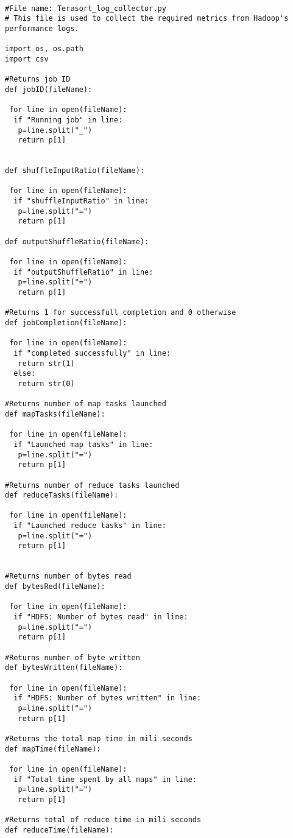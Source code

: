 \begin{verbatim}

#File name: Terasort_log_collector.py 
# This file is used to collect the required metrics from Hadoop's performance logs. 

import os, os.path
import csv

#Returns job ID
def jobID(fileName):

 for line in open(fileName):
  if "Running job" in line:
   p=line.split("_")
   return p[1]


def shuffleInputRatio(fileName):

 for line in open(fileName):
  if "shuffleInputRatio" in line:
   p=line.split("=")
   return p[1]

def outputShuffleRatio(fileName):

 for line in open(fileName):
  if "outputShuffleRatio" in line:
   p=line.split("=")
   return p[1]

#Returns 1 for successfull completion and 0 otherwise
def jobCompletion(fileName):

 for line in open(fileName):
  if "completed successfully" in line:
   return str(1)
  else:
   return str(0)

#Returns number of map tasks launched
def mapTasks(fileName):

 for line in open(fileName):
  if "Launched map tasks" in line:
   p=line.split("=")
   return p[1]

#Returns number of reduce tasks launched
def reduceTasks(fileName):

 for line in open(fileName):
  if "Launched reduce tasks" in line:
   p=line.split("=")
   return p[1]


#Returns number of bytes read
def bytesRed(fileName):

 for line in open(fileName):
  if "HDFS: Number of bytes read" in line:
   p=line.split("=")
   return p[1]

#Returns number of byte written
def bytesWritten(fileName):

 for line in open(fileName):
  if "HDFS: Number of bytes written" in line:
   p=line.split("=")
   return p[1]

#Returns the total map time in mili seconds
def mapTime(fileName):

 for line in open(fileName):
  if "Total time spent by all maps" in line:
   p=line.split("=")
   return p[1]

#Returns total of reduce time in mili seconds
def reduceTime(fileName):


\end{verbatim}
